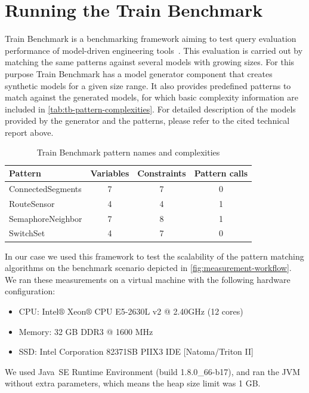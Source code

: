 \section{Running the Train Benchmark}
\label{sec:performance-evaluation-tb}

Train Benchmark is a benchmarking framework aiming to test query evaluation performance of model-driven engineering tools~\cite{trainbenchmark}. This evaluation is carried out by matching the same patterns against several models with growing sizes. For this purpose Train Benchmark has a model generator component that creates synthetic models for a given size range. It also provides predefined patterns to match against the generated models, for which basic complexity information are included in \autoref{tab:tb-pattern-complexities}. For detailed description of the models provided by the generator and the patterns, please refer to the cited technical report above.


 \begin{table}[ht]
 	\centering
 	\begin{tabular}{l|ccc}
 		\hline
 		Pattern & Variables & Constraints & Pattern calls \\
 		\hline
		 ConnectedSegments & 7 & 7 & 0 \\
		 RouteSensor & 4 & 4 & 1 \\
		 SemaphoreNeighbor & 7 & 8 & 1 \\
		 SwitchSet & 4 & 7 & 0 \\
 		\hline
 	\end{tabular}
 	\caption{Train Benchmark pattern names and complexities}
 	\label{tab:tb-pattern-complexities}
 \end{table}



In our case we used this framework to test the scalability of the pattern matching algorithms on the benchmark scenario depicted in \autoref{fig:measurement-workflow}. We ran these measurements on a virtual machine with the following hardware configuration:

\begin{itemize}
	\item CPU: Intel$\circledR$ Xeon$\circledR$ CPU E5-2630L v2 @ 2.40GHz (12 cores)
	\item Memory: 32 GB DDR3 @ 1600 MHz
	\item SSD: Intel Corporation 82371SB PIIX3 IDE [Natoma/Triton II]
\end{itemize}

We used Java\texttrademark~SE Runtime Environment (build 1.8.0\_66-b17), and ran the JVM without extra parameters, which means the heap size limit was 1 GB.

